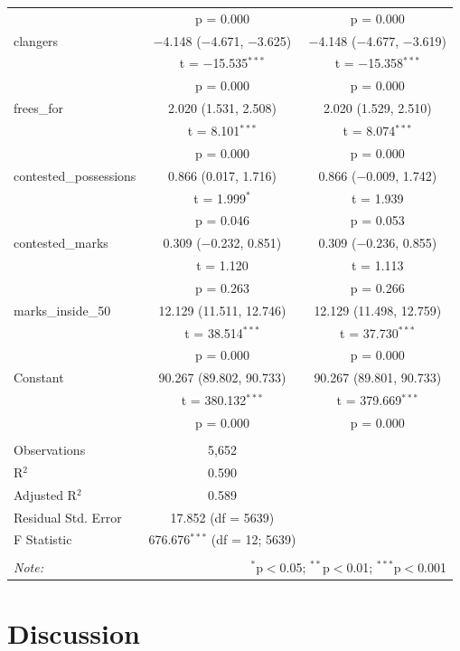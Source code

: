 \documentclass{article}
\begin{document}
\begin{table}[!htbp]
\begin{tabular}{@{\extracolsep{5pt}}lcc}
  & p = 0.000 & p = 0.000 \\ 
  clangers & $-$4.148 ($-$4.671, $-$3.625) & $-$4.148 ($-$4.677, $-$3.619) \\ 
  & t = $-$15.535$^{***}$ & t = $-$15.358$^{***}$ \\ 
  & p = 0.000 & p = 0.000 \\ 
  frees\_for & 2.020 (1.531, 2.508) & 2.020 (1.529, 2.510) \\ 
  & t = 8.101$^{***}$ & t = 8.074$^{***}$ \\ 
  & p = 0.000 & p = 0.000 \\ 
  contested\_possessions & 0.866 (0.017, 1.716) & 0.866 ($-$0.009, 1.742) \\ 
  & t = 1.999$^{*}$ & t = 1.939 \\ 
  & p = 0.046 & p = 0.053 \\ 
  contested\_marks & 0.309 ($-$0.232, 0.851) & 0.309 ($-$0.236, 0.855) \\ 
  & t = 1.120 & t = 1.113 \\ 
  & p = 0.263 & p = 0.266 \\ 
  marks\_inside\_50 & 12.129 (11.511, 12.746) & 12.129 (11.498, 12.759) \\ 
  & t = 38.514$^{***}$ & t = 37.730$^{***}$ \\ 
  & p = 0.000 & p = 0.000 \\ 
  Constant & 90.267 (89.802, 90.733) & 90.267 (89.801, 90.733) \\ 
  & t = 380.132$^{***}$ & t = 379.669$^{***}$ \\ 
  & p = 0.000 & p = 0.000 \\ 
 \hline \\[-1.8ex] 
Observations & 5,652 &  \\ 
R$^{2}$ & 0.590 &  \\ 
Adjusted R$^{2}$ & 0.589 &  \\ 
Residual Std. Error & 17.852 (df = 5639) &  \\ 
F Statistic & 676.676$^{***}$ (df = 12; 5639) &  \\ 
\hline 
\hline \\[-1.8ex] 
\textit{Note:}  & \multicolumn{2}{r}{$^{*}$p$<$0.05; $^{**}$p$<$0.01; $^{***}$p$<$0.001} \\ 
\end{tabular} 
\end{table}

\hypertarget{discussion}{%
\section{Discussion}\label{discussion}}
\end{document}
